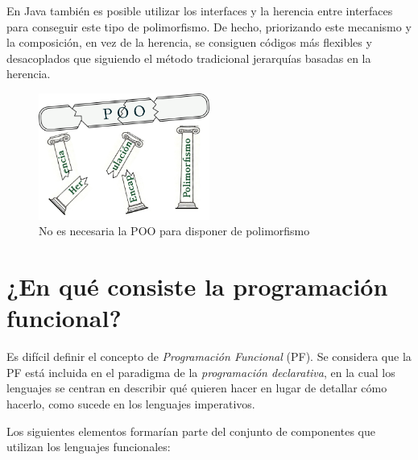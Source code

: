 En Java también es posible utilizar los interfaces y la herencia entre interfaces para conseguir este tipo de polimorfismo. De hecho, priorizando este mecanismo y la composición, en vez de la herencia, se consiguen códigos más flexibles y desacoplados que siguiendo el método tradicional jerarquías basadas en la herencia.

\vspace{0.7em}
\begin{figure}[htb]
   \begin{center}
      \includegraphics[width=0.5\textwidth]{img/pilares_2.png}
      \caption{No es necesaria la POO para disponer de polimorfismo}
      \label{fig_pilares_2}
   \end{center}
\end{figure}

\section{¿En qué consiste la programación funcional?}
\noindent Es difícil definir el concepto de \textit{Programación Funcional} (PF). Se considera que la PF está incluida en el paradigma de la \textit{programación declarativa}, en la cual los lenguajes se centran en describir qué quieren hacer en lugar de detallar cómo hacerlo, como sucede en los lenguajes imperativos.

Los siguientes elementos formarían parte del conjunto de componentes que utilizan los lenguajes funcionales:


